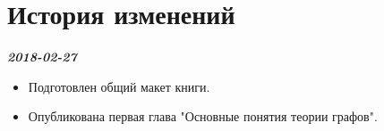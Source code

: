
\chapter{История изменений}

\textit{\textbf{2018-02-27}}

\begin{itemize}
	\item Подготовлен общий макет книги.
	\item Опубликована первая глава "Основные понятия теории графов".
\end{itemize}
